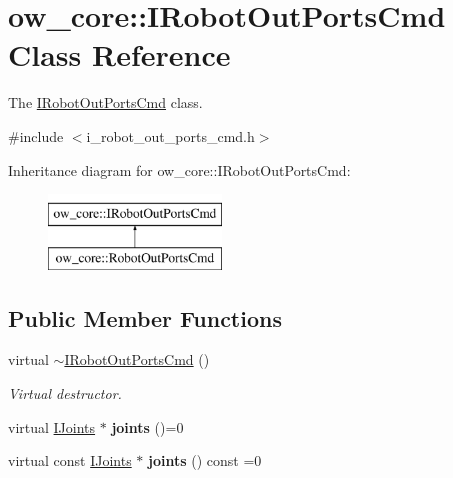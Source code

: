 \hypertarget{classow__core_1_1IRobotOutPortsCmd}{}\section{ow\+\_\+core\+:\+:I\+Robot\+Out\+Ports\+Cmd Class Reference}
\label{classow__core_1_1IRobotOutPortsCmd}


The \hyperlink{classow__core_1_1IRobotOutPortsCmd}{I\+Robot\+Out\+Ports\+Cmd} class.  




{\ttfamily \#include $<$i\+\_\+robot\+\_\+out\+\_\+ports\+\_\+cmd.\+h$>$}

Inheritance diagram for ow\+\_\+core\+:\+:I\+Robot\+Out\+Ports\+Cmd\+:\begin{figure}[H]
\begin{center}
\leavevmode
\includegraphics[height=2.000000cm]{d9/dce/classow__core_1_1IRobotOutPortsCmd}
\end{center}
\end{figure}
\subsection*{Public Member Functions}
\begin{DoxyCompactItemize}
\item 
virtual \hyperlink{classow__core_1_1IRobotOutPortsCmd_a33b6764ab04df38260bd20680aea1500}{$\sim$\+I\+Robot\+Out\+Ports\+Cmd} ()\hypertarget{classow__core_1_1IRobotOutPortsCmd_a33b6764ab04df38260bd20680aea1500}{}\label{classow__core_1_1IRobotOutPortsCmd_a33b6764ab04df38260bd20680aea1500}

\begin{DoxyCompactList}\small\item\em Virtual destructor. \end{DoxyCompactList}\item 
virtual \hyperlink{classow__core_1_1IJoints}{I\+Joints} $\ast$ {\bfseries joints} ()=0\hypertarget{classow__core_1_1IRobotOutPortsCmd_a4285bd03e22215bb48c255d14d322255}{}\label{classow__core_1_1IRobotOutPortsCmd_a4285bd03e22215bb48c255d14d322255}

\item 
virtual const \hyperlink{classow__core_1_1IJoints}{I\+Joints} $\ast$ {\bfseries joints} () const =0\hypertarget{classow__core_1_1IRobotOutPortsCmd_a08ce418625a9680ae6c2e00efb2a2119}{}\label{classow__core_1_1IRobotOutPortsCmd_a08ce418625a9680ae6c2e00efb2a2119}

\end{DoxyCompactItemize}


